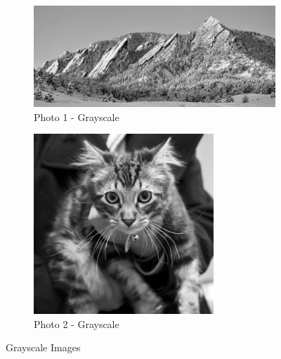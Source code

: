 \begin{figure}[ht]
  \centering
  \begin{subfigure}{\textwidth}
    \centering
    \includegraphics[scale=0.4]{./img/gray1.png}
    \caption{Photo 1 -
    Grayscale}
    \label{fig:p1g}
  \end{subfigure}
  \begin{subfigure}{\textwidth}
    \centering
    \includegraphics[scale=0.4]{./img/gray2.png}
    \caption{Photo
      2
      -
    Grayscale}
    \label{fig:p2g}
  \end{subfigure}
  \caption{Grayscale
  Images}
  \label{fig:gray_images}
\end{figure}

